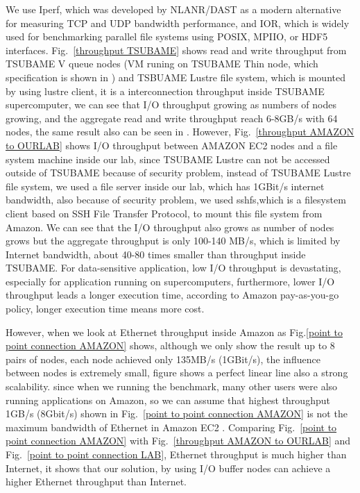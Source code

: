 We use Iperf\cite{iperf}, which was developed by NLANR/DAST as a modern alternative for measuring TCP and UDP bandwidth performance, and IOR\cite{IOR}, which is widely used for benchmarking parallel file systems using POSIX, MPIIO, or HDF5 interfaces.
Fig.~\ref{throughput TSUBAME} shows read and write throughput from TSUBAME V queue nodes (VM runing on TSUBAME Thin node, which specification is shown in ) and TSBUAME Lustre file system, which is mounted by using lustre client, it is a interconnection throughput inside TSUBAME supercomputer, we can see that I/O throughput growing as numbers of nodes growing, and the aggregate read and write throughput reach 6-8GB/s with 64 nodes, the same result also can be seen in \cite{checkpointing}.
However, Fig.~\ref{throughput AMAZON to OURLAB} shows I/O throughput between AMAZON EC2 nodes and a file system machine inside our lab, since TSUBAME Lustre can not be accessed outside of TSUBAME because of security problem, instead of TSUBAME Lustre file system, we used a file server inside our lab, which has 1GBit/s internet bandwidth, also because of security problem, we used sshfs\cite{sshfs},which is a filesystem client based on SSH File Transfer Protocol, to mount this file system from Amazon.
We can see that the I/O throughput also grows as number of nodes grows but the aggregate throughput is only 100-140 MB/s, which is limited by Internet bandwidth, about 40-80 times smaller than throughput inside TSUBAME.
For data-sensitive application, low I/O throughput is devastating, especially for application running on supercomputers, furthermore, lower I/O throughput leads a longer execution time, according to Amazon pay-as-you-go policy, longer execution time means more cost.

However, when we look at Ethernet throughput inside Amazon as Fig.\ref{point to point connection AMAZON} shows, although we only show the result up to 8 pairs of nodes, each node achieved only 135MB/s (1GBit/s), the influence between nodes is extremely small, figure shows a perfect linear line also a strong scalability.
since when we running the benchmark, many other users were also running applications on Amazon, so we can assume that highest throughput 1GB/s (8Gbit/s) shown in Fig.~\ref{point to point connection AMAZON} is not the maximum bandwidth of Ethernet in Amazon EC2 .
Comparing Fig.~\ref{point to point connection AMAZON} with Fig.~\ref{throughput AMAZON to OURLAB} and Fig.~\ref{point to point connection LAB}, Ethernet throughput is much higher than Internet, it shows that our solution, by using I/O buffer nodes can achieve a higher Ethernet throughput than Internet.

